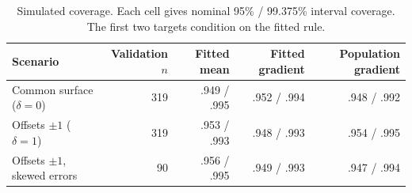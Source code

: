 \begin{table}[htbp]
\centering\small
\caption{Simulated coverage. Each cell gives nominal 95\% / 99.375\% interval coverage. The first two targets condition on the fitted rule.}
\label{tab:sim-audit}
\begin{tabular}{lrrrr}
\toprule
Scenario & Validation $n$ & Fitted mean & Fitted gradient & Population gradient \\
\midrule
Common surface ($\delta=0$) & 319 & .949 / .995 & .952 / .994 & .948 / .992 \\
Offsets $\pm1$ ($\delta=1$) & 319 & .953 / .993 & .948 / .993 & .954 / .995 \\
Offsets $\pm1$, skewed errors & 90 & .956 / .995 & .949 / .993 & .947 / .994 \\
\bottomrule
\end{tabular}
\end{table}
